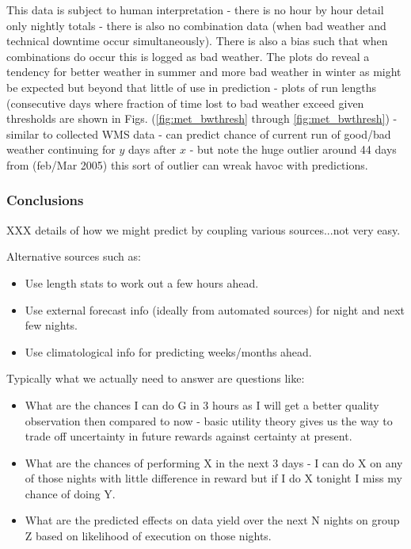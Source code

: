 This data is subject to human interpretation - there is no hour by hour detail only nightly totals - there is also no combination data (when bad weather and technical downtime occur simultaneously). There is also a bias such that when combinations do occur this is logged as bad weather. The plots do reveal a tendency for better weather in summer and more bad weather in winter as might be expected but beyond that little of use in prediction - plots of run lengths (consecutive days where fraction of time lost to bad weather exceed given thresholds are shown in Figs. (\ref{fig:met_bwthresh} through \ref{fig:met_bwthresh}) - similar to collected WMS data - can predict chance of current run of good/bad weather continuing for $y$ days after $x$ - but note the huge outlier around 44 days from (feb/Mar 2005) this sort of outlier can wreak havoc with predictions.


\subsubsection{Conclusions}

XXX details of how we might predict by coupling various sources...not very easy.

Alternative sources such as:

\begin{itemize}
\item Use length stats to work out a few hours ahead.
\item Use external forecast info (ideally from automated sources) for night and next few nights.
\item Use climatological info for predicting weeks/months ahead.
\end{itemize}

Typically what we actually need to answer are questions like:
\begin{itemize}
\item What are the chances I can do G in 3 hours as I will get a better quality observation then compared to now - basic utility theory gives us the way to trade off uncertainty in future rewards against certainty at present. 
\item What are the chances of performing X in the next 3 days - I can do X on any of those nights with little difference in reward but if I do X tonight I miss my chance of doing Y.
\item What are the predicted effects on data yield over the next N nights on group Z based on likelihood of execution on those nights.
\end{itemize}

